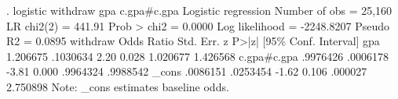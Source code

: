 . logistic withdraw gpa c.gpa\#c.gpa
{\smallskip}
Logistic regression                             Number of obs     =     25,160
                                                LR chi2(2)        =     441.91
                                                Prob > chi2       =     0.0000
Log likelihood = -2248.8207                     Pseudo R2         =     0.0895
{\smallskip}
    withdraw {\VBAR} Odds Ratio   Std. Err.      z    P>|z|     [95\% Conf. Interval]
         gpa {\VBAR}   1.206675   .1030634     2.20   0.028     1.020677    1.426568
             {\VBAR}
 c.gpa\#c.gpa {\VBAR}   .9976426   .0006178    -3.81   0.000     .9964324    .9988542
             {\VBAR}
       _cons {\VBAR}   .0086151   .0253454    -1.62   0.106      .000027    2.750898
Note: _cons estimates baseline odds.
{\smallskip}
